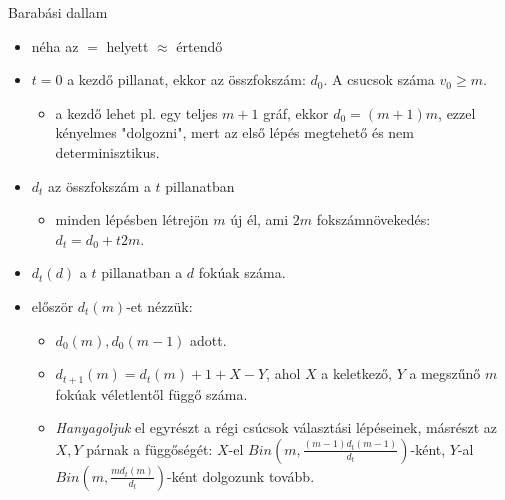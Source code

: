 \documentclass[14pt]{extarticle}
\newcommand{\zjel}[1]{%
{ \left( #1 \right) }
}
\begin{document}
\begin{spacing}{1.5}

	\par\centerline{Barabási dallam}

	\begin{itemize}
		\item néha az $=$ helyett $\approx$ értendő

		\item $t=0$ a kezdő pillanat, ekkor az összfokszám: $d_{0}$. A csucsok száma
		$v_{0}\ge m.$ 
		\begin{itemize}
			\item a kezdő lehet pl. egy teljes $m+1$ gráf, ekkor $d_{0}=(m+1)m$, 
			\newline ezzel kényelmes "dolgozni", mert az első lépés megtehető és 
			nem determinisztikus.
		\end{itemize}

		\item $d_{t}$ az összfokszám a $t$ pillanatban
		\begin{itemize}
			\item minden lépésben létrejön $m$ új él, ami $2m$ fokszámnövekedés:
			\newline $d_{t}=d_{0}+t2m$. 
		\end{itemize}
		\item $d_{t}(d)$ a $t$ pillanatban a $d$ fokúak száma.
		\item először $d_{t}(m)$-et nézzük:
		\begin{itemize}
			\item $d_{0}(m),d_{0}(m-1)$ adott.

			\item $d_{t+1}(m)=d_{t}(m)+1+X-Y$, ahol $X$ a keletkező, $Y$ a megszűnő $m$ fokúak véletlentől függő száma.

			\item {\it Hanyagoljuk} el egyrészt a régi csúcsok választási lépéseinek, másrészt az $X,Y$ párnak a függőségét:
			\newline $X$-el $Bin\zjel{m,\frac{(m-1)d_{t}(m-1)}{d_{t}}}$-ként, 
         \newline $Y$-al $Bin\zjel{m,\frac{md_{t}(m)}{d_{t}}}$-ként dolgozunk tovább.



\end{itemize}
\end{itemize}
\end{spacing}
\end{document}
